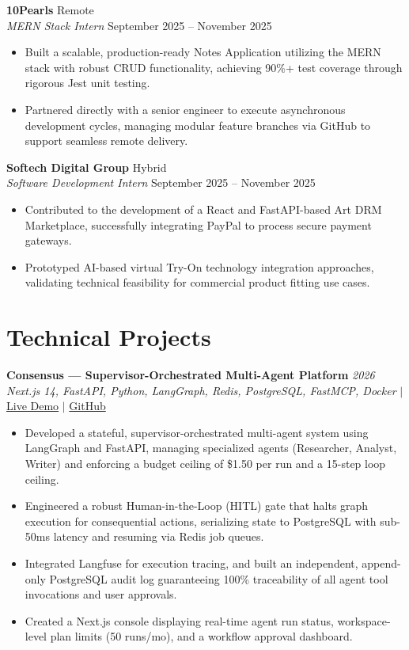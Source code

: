 \documentclass[11pt, a4paper]{article}
\begin{document}
\textbf{10Pearls} \hfill Remote \\
\textit{MERN Stack Intern} \hfill September 2025 -- November 2025
\begin{itemize}[leftmargin=0.25in, itemsep=2pt]
    \item Built a scalable, production-ready Notes Application utilizing the MERN stack with robust CRUD functionality, achieving 90\%+ test coverage through rigorous Jest unit testing.
    \item Partnered directly with a senior engineer to execute asynchronous development cycles, managing modular feature branches via GitHub to support seamless remote delivery.
\end{itemize}

\textbf{Softech Digital Group} \hfill Hybrid \\
\textit{Software Development Intern} \hfill September 2025 -- November 2025
\begin{itemize}[leftmargin=0.25in, itemsep=2pt]
    \item Contributed to the development of a React and FastAPI-based Art DRM Marketplace, successfully integrating PayPal to process secure payment gateways.
    \item Prototyped AI-based virtual Try-On technology integration approaches, validating technical feasibility for commercial product fitting use cases.
\end{itemize}

\section*{Technical Projects}

\textbf{Consensus — Supervisor-Orchestrated Multi-Agent Platform} \hfill \textit{2026} \\
\textit{Next.js 14, FastAPI, Python, LangGraph, Redis, PostgreSQL, FastMCP, Docker} $|$ \href{https://consensus-ai-saas.vercel.app/}{Live Demo} $|$ \href{https://github.com/SShayanHussain/consensus}{GitHub}
\begin{itemize}[leftmargin=0.25in, itemsep=2pt]
    \item Developed a stateful, supervisor-orchestrated multi-agent system using LangGraph and FastAPI, managing specialized agents (Researcher, Analyst, Writer) and enforcing a budget ceiling of \$1.50 per run and a 15-step loop ceiling.
    \item Engineered a robust Human-in-the-Loop (HITL) gate that halts graph execution for consequential actions, serializing state to PostgreSQL with sub-50ms latency and resuming via Redis job queues.
    \item Integrated Langfuse for execution tracing, and built an independent, append-only PostgreSQL audit log guaranteeing 100\% traceability of all agent tool invocations and user approvals.
    \item Created a Next.js console displaying real-time agent run status, workspace-level plan limits (50 runs/mo), and a workflow approval dashboard.
\end{itemize}
\end{document}
